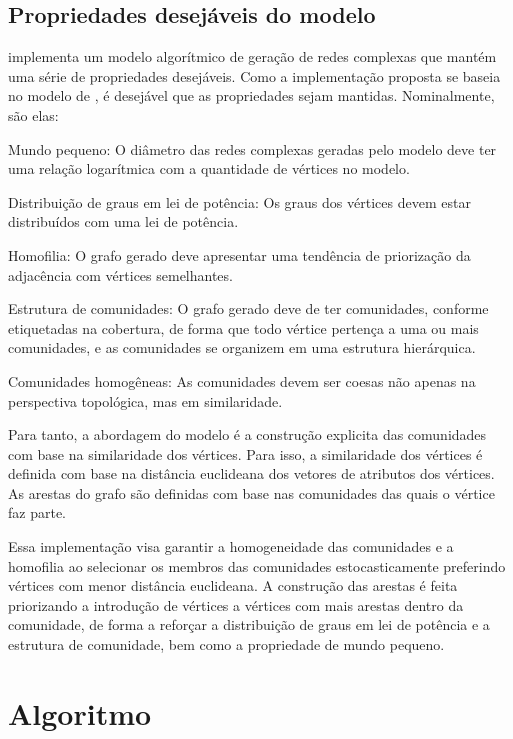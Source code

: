 \documentclass[notes.tex]{subfiles}
\begin{document}
\subsection{Propriedades desejáveis do modelo}

 implementa um modelo algorítmico de geração de redes complexas que mantém uma série de propriedades desejáveis.
Como a implementação proposta se baseia no modelo de , é desejável que as propriedades sejam mantidas.
Nominalmente, são elas:

\begin{alineas}
    \item Mundo pequeno: O diâmetro das redes complexas geradas pelo modelo deve ter uma relação logarítmica com a quantidade de vértices no modelo.
    \item Distribuição de graus em lei de potência: Os graus dos vértices devem estar distribuídos com uma lei de potência.
    \item Homofilia: O grafo gerado deve apresentar uma tendência de priorização da adjacência com vértices semelhantes.
    \item Estrutura de comunidades: O grafo gerado deve de ter comunidades, conforme etiquetadas na cobertura, de forma que todo vértice pertença a uma ou mais comunidades, e as comunidades se organizem em uma estrutura hierárquica.
    \item Comunidades homogêneas: As comunidades devem ser coesas não apenas na perspectiva topológica, mas em similaridade.
\end{alineas}

Para tanto, a abordagem do modelo é a construção explicita das comunidades com base na similaridade dos vértices.
Para isso, a similaridade dos vértices é definida com base na distância euclideana dos vetores de atributos dos vértices.
As arestas do grafo são definidas com base nas comunidades das quais o vértice faz parte.

Essa implementação visa garantir a homogeneidade das comunidades e a homofilia ao selecionar os membros das comunidades estocasticamente preferindo vértices com menor distância euclideana.
A construção das arestas é feita priorizando a introdução de vértices a vértices com mais arestas dentro da comunidade, de forma a reforçar a distribuição de graus em lei de potência e a estrutura de comunidade, bem como a propriedade de mundo pequeno.

\section{Algoritmo}
\end{document}
